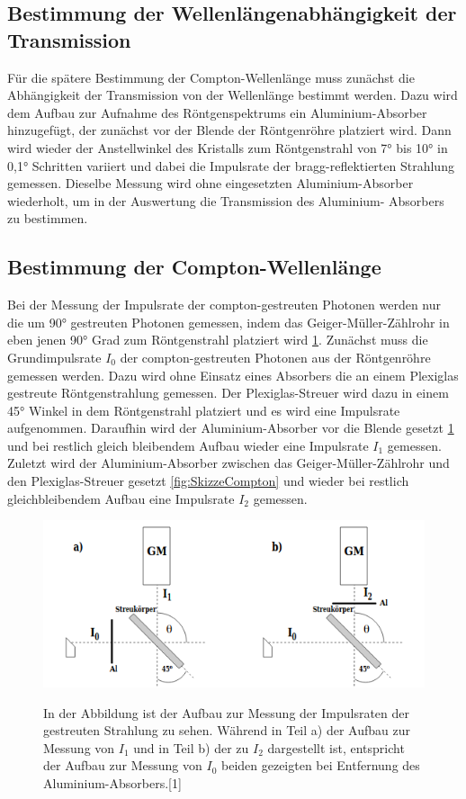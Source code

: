 \documentclass[titlepage = firstcover]{scrartcl}
\begin{document}
        \subsection{Bestimmung der Wellenlängenabhängigkeit der Transmission}
        Für die spätere Bestimmung der Compton-Wellenlänge muss zunächst die Abhängigkeit der Transmission von der Wellenlänge bestimmt werden. Dazu wird dem
        Aufbau zur Aufnahme des Röntgenspektrums ein Aluminium-Absorber hinzugefügt, der zunächst vor der Blende der Röntgenröhre platziert wird. Dann wird 
        wieder der Anstellwinkel des Kristalls zum Röntgenstrahl von 7° bis 10° in 0,1° Schritten variiert und dabei die Impulsrate der bragg-reflektierten
        Strahlung gemessen. Dieselbe Messung wird ohne eingesetzten Aluminium-Absorber wiederholt, um in der Auswertung die Transmission des Aluminium-
        Absorbers zu bestimmen.

        \subsection{Bestimmung der Compton-Wellenlänge}
        Bei der Messung der Impulsrate der compton-gestreuten Photonen werden nur die um 90° gestreuten Photonen gemessen, indem das Geiger-Müller-Zählrohr
        in eben jenen 90° Grad zum Röntgenstrahl platziert wird \ref{fig:SkizzeAbsorber}. 
        Zunächst muss die Grundimpulsrate $I_0$ der compton-gestreuten Photonen aus der Röntgenröhre gemessen werden. Dazu wird ohne Einsatz eines Absorbers
        die an einem Plexiglas gestreute Röntgenstrahlung gemessen. Der Plexiglas-Streuer wird dazu in einem 45° Winkel in dem Röntgenstrahl platziert und es 
        wird eine Impulsrate aufgenommen. Daraufhin wird der Aluminium-Absorber vor die Blende gesetzt \ref{fig:SkizzeAbsorber} und bei restlich gleich bleibendem Aufbau wieder
        eine Impulsrate $I_1$ gemessen. Zuletzt wird der Aluminium-Absorber zwischen das Geiger-Müller-Zählrohr und den Plexiglas-Streuer gesetzt  
        \ref{fig:SkizzeCompton} und wieder bei restlich gleichbleibendem Aufbau eine Impulsrate $I_2$ gemessen.

        \FloatBarrier
        \begin{figure}[h]
            \centering
            \caption{In der Abbildung ist der Aufbau zur Messung der Impulsraten der gestreuten Strahlung zu sehen. Während in Teil a) der Aufbau zur Messung von $I_1$ und in Teil b) der zu $I_2$ dargestellt ist, entspricht der Aufbau zur Messung von $I_0$ beiden gezeigten bei Entfernung des Aluminium-Absorbers.[1]}
            \includegraphics[width = 0.8\linewidth]{absorber.png}
            \label{fig:SkizzeAbsorber}
        \end{figure} 
        \FloatBarrier
        \newpage
\end{document}
